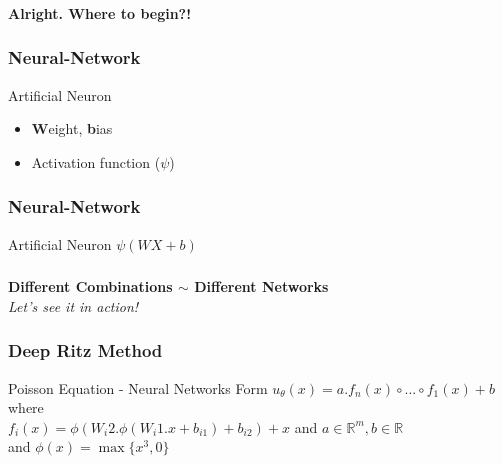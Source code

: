 \documentclass{beamer}
\newcommand{\R}{\mathbb{R}}
\begin{document}
\begin{frame}
	\frametitle{}
	
	\textbf{Alright. Where to begin?!}\centering\\
	
\end{frame}

\begin{frame}
	\frametitle{Neural-Network}	
	  \begin{block}{Artificial Neuron}
		\begin{itemize}
			\item <1- > \textbf{W}eight, \textbf{b}ias 
			\item <2- > Activation function (\textbf{$\psi$})
		\end{itemize}	
	\end{block}
\end{frame}

\begin{frame}
	\frametitle{Neural-Network}
		  \begin{block}{Artificial Neuron}
			\textbf{$\psi(WX+b)$}\centering\\	
	   	\end{block}	
\end{frame}


\begin{frame}
	\frametitle{}
	
	\textbf{Different Combinations $\sim$ Different Networks}\centering\\
	\textit{Let's see it in action!}\centering\\
	
\end{frame}

\begin{frame}
	\frametitle{Deep Ritz Method}
	
	\begin{block}{Poisson Equation - Neural Networks Form}
	$u_{\theta}(x) = a . f_{n}(x) \circ ... \circ f_{1}(x) +b$ \\
	where \\
	$f_{i}(x) = \phi(W_i2 . \phi(W_i1 . x + b_{i1}) + b_{i2}) + x $ and $a \in \R^m, b\in\R $ \\
	and $\phi(x) = \max\{x^3,0\}$
	\end{block}	
\end{frame}
\end{document}
